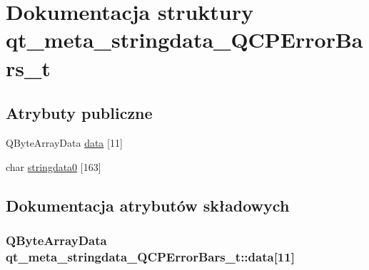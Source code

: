 \hypertarget{structqt__meta__stringdata___q_c_p_error_bars__t}{}\section{Dokumentacja struktury qt\+\_\+meta\+\_\+stringdata\+\_\+\+Q\+C\+P\+Error\+Bars\+\_\+t}
\label{structqt__meta__stringdata___q_c_p_error_bars__t}
\subsection*{Atrybuty publiczne}
\begin{DoxyCompactItemize}
\item 
Q\+Byte\+Array\+Data \hyperlink{structqt__meta__stringdata___q_c_p_error_bars__t_a806cc685f8b46afdca68d6d320f2450b}{data} \mbox{[}11\mbox{]}
\item 
char \hyperlink{structqt__meta__stringdata___q_c_p_error_bars__t_a651dca586cf4ad7d2d0c36d8723c59b2}{stringdata0} \mbox{[}163\mbox{]}
\end{DoxyCompactItemize}


\subsection{Dokumentacja atrybutów składowych}
\subsubsection[{\texorpdfstring{data}{data}}]{\setlength{\rightskip}{0pt plus 5cm}Q\+Byte\+Array\+Data qt\+\_\+meta\+\_\+stringdata\+\_\+\+Q\+C\+P\+Error\+Bars\+\_\+t\+::data\mbox{[}11\mbox{]}}\hypertarget{structqt__meta__stringdata___q_c_p_error_bars__t_a806cc685f8b46afdca68d6d320f2450b}{}\label{structqt__meta__stringdata___q_c_p_error_bars__t_a806cc685f8b46afdca68d6d320f2450b}

